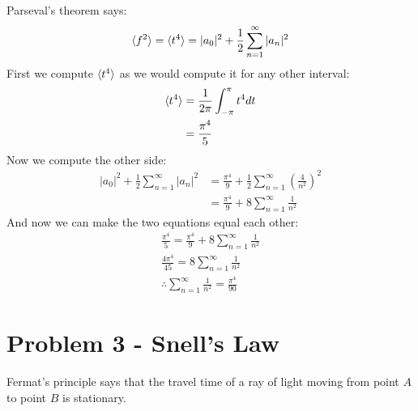 \documentclass[10pt]{article}
\begin{document}
\begin{enumerate}[(a)]
        \begin{solution}
            Parseval's theorem says:
            \[ \langle f^2 \rangle = \langle t^4 \rangle = |a_0|^2 + \frac 12 \sum_{n = 1}^\infty |a_n|^2\]
            First we compute $\langle t^4 \rangle$ as we would compute it for any other interval: 
            \begin{align*}
                \langle t^4 \rangle &= \frac{1}{2\pi}\int_{-\pi}^{\pi} t^4 dt \\
                &= \frac{\pi^4}{5}
            \end{align*}
            Now we compute the other side: 
            \begin{align*}
                |a_0|^2 + \frac 12 \sum_{n = 1}^\infty |a_n|^2 &= \frac{\pi^4}{9} + \frac 12 \sum_{n = 1}^\infty \left(\frac{4}{n^2}\right)^2\\
                &= \frac{\pi^4}{9} + 8 \sum_{n = 1}^\infty \frac{1}{n^2}
            \end{align*}
            And now we can make the two equations equal each other: 
            \begin{align*}
                \frac{\pi^4}{5} = \frac{\pi^4}{9} + 8 \sum_{n = 1}^\infty \frac{1}{n^2}\\
                \frac{4\pi^4}{45} = 8 \sum_{n = 1}^\infty \frac{1}{n^2}\\
                \therefore \sum_{n = 1}^\infty \frac{1}{n^2} = \frac{\pi^4}{90}
            \end{align*}
        \end{solution}
    \end{enumerate}

    \pagebreak

    \section*{Problem 3 - Snell's Law} 

    Fermat's principle says that the travel time of a ray of light moving from point $A$ to point $B$ is stationary. 
\end{document}
